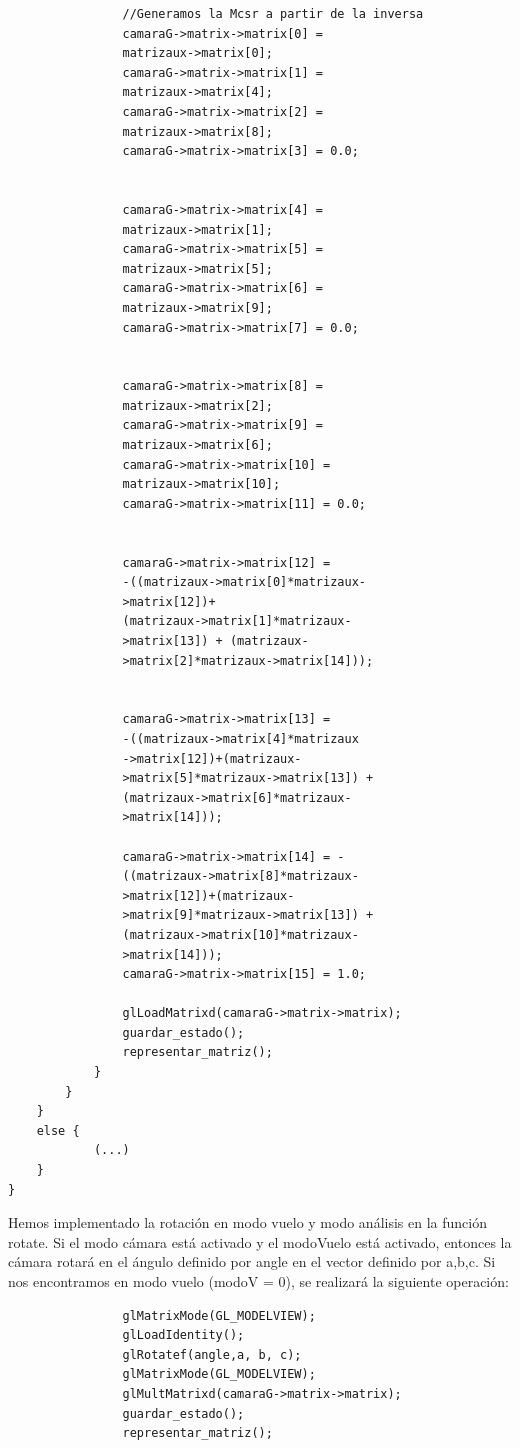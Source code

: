 \documentclass[12pt,a4paper]{article}
\begin{document}
\begin{enumerate}
\begin{enumerate}
\begin{enumerate}
\begin{lstlisting}
				//Generamos la Mcsr a partir de la inversa
				camaraG->matrix->matrix[0] = 
				matrizaux->matrix[0];
				camaraG->matrix->matrix[1] = 
				matrizaux->matrix[4];
				camaraG->matrix->matrix[2] = 
				matrizaux->matrix[8];	
				camaraG->matrix->matrix[3] = 0.0;

	
				camaraG->matrix->matrix[4] = 
				matrizaux->matrix[1];
				camaraG->matrix->matrix[5] = 
				matrizaux->matrix[5];	
				camaraG->matrix->matrix[6] = 
				matrizaux->matrix[9];	
				camaraG->matrix->matrix[7] = 0.0;
	
	
				camaraG->matrix->matrix[8] = 
				matrizaux->matrix[2];	
				camaraG->matrix->matrix[9] = 
				matrizaux->matrix[6];
				camaraG->matrix->matrix[10] = 
				matrizaux->matrix[10];
				camaraG->matrix->matrix[11] = 0.0;
	
	
				camaraG->matrix->matrix[12] = 
				-((matrizaux->matrix[0]*matrizaux-
				>matrix[12])+
				(matrizaux->matrix[1]*matrizaux-
				>matrix[13]) + (matrizaux-
				>matrix[2]*matrizaux->matrix[14]));
				
				
				camaraG->matrix->matrix[13] = 
				-((matrizaux->matrix[4]*matrizaux
				->matrix[12])+(matrizaux-
				>matrix[5]*matrizaux->matrix[13]) + 
				(matrizaux->matrix[6]*matrizaux-
				>matrix[14]));
								
				camaraG->matrix->matrix[14] = -
				((matrizaux->matrix[8]*matrizaux-
				>matrix[12])+(matrizaux-
				>matrix[9]*matrizaux->matrix[13]) + 
				(matrizaux->matrix[10]*matrizaux-
				>matrix[14]));
				camaraG->matrix->matrix[15] = 1.0;

				glLoadMatrixd(camaraG->matrix->matrix);	
        		guardar_estado();
        		representar_matriz();
            }  
        }
    }
    else {
			(...)
    }
}

\end{lstlisting}
Hemos implementado la rotación en modo vuelo y modo análisis en la función rotate. Si el modo cámara está activado y el modoVuelo está activado, entonces la cámara rotará en el ángulo definido por angle en el vector definido por a,b,c.
\newline
Si nos encontramos en modo vuelo (modoV = 0), se realizará la siguiente operación:

\begin{lstlisting}
            	glMatrixMode(GL_MODELVIEW);
	            glLoadIdentity();
	            glRotatef(angle,a, b, c);
	            glMatrixMode(GL_MODELVIEW);
	            glMultMatrixd(camaraG->matrix->matrix);
	            guardar_estado();
	            representar_matriz();
\end{lstlisting}


\end{enumerate}
\end{enumerate}
\end{enumerate}
\end{document}

